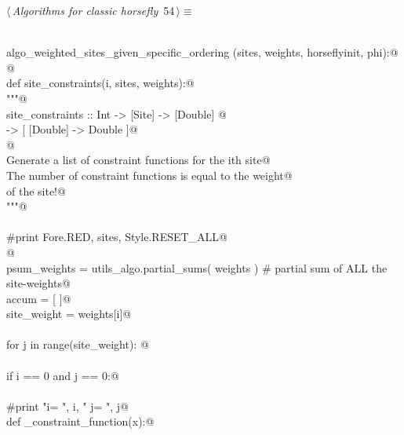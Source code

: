 \documentclass[11.5pt]{report}
\begin{document}
\vspace{-0.8cm} \newchunk
\begin{flushleft} \small\label{scrap80}\raggedright\small
{} $\langle\,${\itshape Algorithms for classic horsefly}\nobreak\ {\footnotesize {54}}$\,\rangle\equiv$
\vspace{-1ex}
\begin{list}{}{} \item
\mbox{}\verb@@\\
\mbox{}\verb@def algo_weighted_sites_given_specific_ordering (sites, weights, horseflyinit, phi):@\\
\mbox{}\verb@      @\\
\mbox{}\verb@     def site_constraints(i, sites, weights):@\\
\mbox{}\verb@          """@\\
\mbox{}\verb@          site_constraints :: Int -> [Site] -> [Double] @\\
\mbox{}\verb@                          -> [ [Double] -> Double  ]@\\
\mbox{}\verb@          @\\
\mbox{}\verb@          Generate a list of constraint functions for the ith site@\\
\mbox{}\verb@          The number of constraint functions is equal to the weight@\\
\mbox{}\verb@          of the site!@\\
\mbox{}\verb@          """@\\
\mbox{}\verb@@\\
\mbox{}\verb@          #print Fore.RED, sites, Style.RESET_ALL@\\
\mbox{}\verb@         @\\
\mbox{}\verb@          psum_weights = utils_algo.partial_sums( weights ) # partial sum of ALL the site-weights@\\
\mbox{}\verb@          accum        = [ ]@\\
\mbox{}\verb@          site_weight  = weights[i]@\\
\mbox{}\verb@@\\
\mbox{}\verb@          for j in range(site_weight): @\\
\mbox{}\verb@@\\
\mbox{}\verb@              if i == 0 and j == 0:@\\
\mbox{}\verb@@\\
\mbox{}\verb@                    #print "i= ", i, " j= ", j@\\
\mbox{}\verb@                    def _constraint_function(x):@\\

\end{list}
\end{flushleft}
\end{document}
